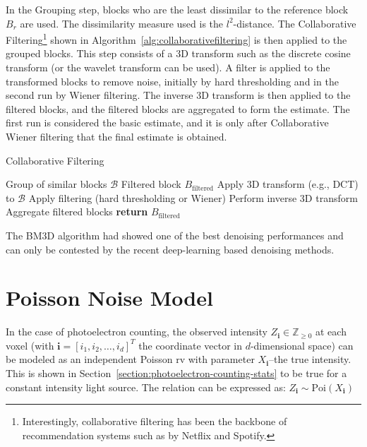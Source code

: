 In the Grouping step, blocks who are the least dissimilar to the reference block $B_r$ are used. The dissimilarity measure used is the $l^2$-distance. The Collaborative Filtering\footnote{Interestingly, collaborative filtering has been the backbone of recommendation systems such as by Netflix and Spotify.} shown in Algorithm~\ref{alg:collaborativefiltering} is then applied to the grouped blocks. This step consists of a 3D transform such as the discrete cosine transform (or the wavelet transform can be used). A filter is applied to the transformed blocks to remove noise, initially by hard thresholding and in the second run by Wiener filtering. The inverse 3D transform is then applied to the filtered blocks, and the filtered blocks are aggregated to form the estimate. The first run is considered the basic estimate, and it is only after Collaborative Wiener filtering that the final estimate is obtained.
    
\begin{algorithm}
    \caption{Collaborative Filtering}\label{alg:collaborativefiltering}
    \begin{algorithmic}[1]
    \Require Group of similar blocks $\mathcal{B}$
    \Ensure Filtered block $B_{\text{filtered}}$
        \State Apply 3D transform (e.g., DCT) to $\mathcal{B}$
        \State Apply filtering (hard thresholding or Wiener)
        \State Perform inverse 3D transform
        \State Aggregate filtered blocks
        \State \textbf{return} $B_{\text{filtered}}$
    \EndProcedure
    \end{algorithmic}
\end{algorithm}

The \gls{BM3D} algorithm had showed one of the best denoising performances and can only be contested by the recent deep-learning based denoising methods. 

\section{Poisson Noise Model}\label{sec:poisson-noise-model}
In the case of photoelectron counting, the observed intensity $Z_{\mathbf{i}} \in \mathbb{Z}_{\geq 0}$ at each voxel (with $\mathbf{i} = [i_1, i_2, \dots, i_d]^T$ the coordinate vector in $d$-dimensional space) can be modeled as an independent Poisson \gls{rv} with parameter $X_{\mathbf{i}}$--the true intensity. This is shown in Section~\ref{section:photoelectron-counting-stats} to be true for a constant intensity light source. The relation can be expressed as: $Z_{\mathbf{i}} \sim \text{Poi}(X_{\mathbf{i}})$

